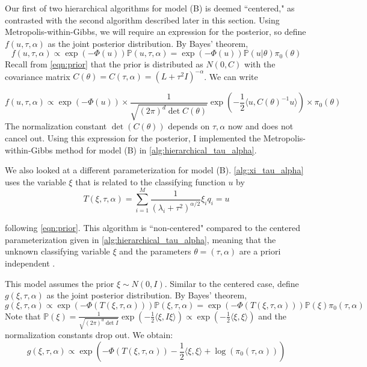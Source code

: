 \documentclass{siamart1116}
\begin{document}
Our first of two hierarchical algorithms for model (B) is deemed ``centered," as contrasted with the second algorithm described later in this section. Using Metropolis-within-Gibbs, we will require an expression for the posterior, so define $f(u,\tau,\alpha)$ as the joint posterior distribution. By Bayes' theorem, 
\[f(u,\tau,\alpha) \propto \exp(-\Phi(u))\mathbb{P}(u,\tau,\alpha) = \exp(-\Phi(u))\mathbb{P}(u|\theta)\pi_0(\theta)\]
Recall from \cref{eqn:prior} that the prior is distributed as $N(0, C)$ with the covariance matrix $C(\theta) = C(\tau, \alpha) = (L + \tau^2I)^{-\alpha}$. We can write

\begin{equation}
\label{eqn:centered_post}
f(u,\tau,\alpha) \propto \exp(-\Phi(u))\times \frac{1}{\sqrt{(2\pi)^d \det C(\theta)}} \exp(-\frac{1}{2}\langle u, C(\theta)^{-1}u  \rangle) \times \pi_0(\theta)
\end{equation}
The normalization constant $\det(C(\theta))$ depends on $\tau, \alpha$ now and does not cancel out. Using this expression for the posterior, I implemented the Metropolis-within-Gibbs method for model (B) in \cref{alg:hierarchical_tau_alpha}.


We also looked at a different parameterization for model (B). \cref{alg:xi_tau_alpha} uses the variable $\xi$ that is related to the classifying function $u$ by 
\begin{equation}
\label{eqn:noncentered_T}
T(\xi,\tau,\alpha) = \sum_{i=1}^M \frac{1}{(\lambda_i+\tau^2)^{\alpha/2}}\xi_iq_i = u
\end{equation}

following \cref{eqn:prior}. This algorithm is ``non-centered" compared to the centered parameterization given in \cref{alg:hierarchical_tau_alpha}, meaning that the unknown classifying variable $\xi$ and the parameters $\theta=(\tau,\alpha)$ are a priori independent \cite{Noncentered}.

This model assumes the prior $\xi \sim N(0,I)$. Similar to the centered case, define $g(\xi,\tau,\alpha)$ as the joint posterior distribution. By Bayes' theorem, 
\[g(\xi,\tau,\alpha) \propto \exp(-\Phi(T(\xi,\tau,\alpha)))\mathbb{P}(\xi,\tau,\alpha) = \exp(-\Phi(T(\xi,\tau,\alpha)))\mathbb{P}(\xi)\pi_0(\tau, \alpha)\]
Note that $\mathbb{P}(\xi) = \frac{1}{\sqrt{(2\pi)^d \det I}} \exp(-\frac{1}{2}\langle \xi, I\xi  \rangle) \propto \exp(-\frac{1}{2}\langle \xi,\xi \rangle)$ and the normalization constants drop out. We obtain:
\begin{equation}
\label{eqn:noncentered_post}
g(\xi,\tau,\alpha) \propto \exp\left( -\Phi(T(\xi,\tau,\alpha))-\frac{1}{2}\langle \xi,\xi \rangle + \log(\pi_0(\tau,\alpha)) \right)
\end{equation}
\end{document}
